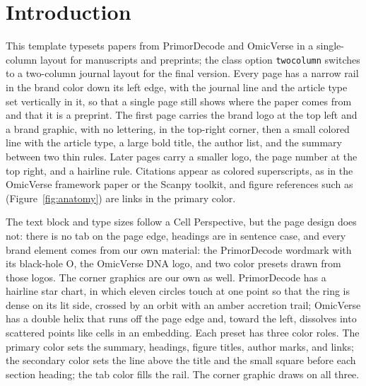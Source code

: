 
\section{Introduction}

This template typesets papers from PrimorDecode and OmicVerse in a single-column layout for manuscripts and preprints; the class option \texttt{twocolumn} switches to a two-column journal layout for the final version. Every page has a narrow rail in the brand color down its left edge, with the journal line and the article type set vertically in it, so that a single page still shows where the paper comes from and that it is a preprint. The first page carries the brand logo at the top left and a brand graphic, with no lettering, in the top-right corner, then a small colored line with the article type, a large bold title, the author list, and the summary between two thin rules. Later pages carry a smaller logo, the page number at the top right, and a hairline rule. Citations appear as colored superscripts, as in the OmicVerse framework paper\cite{zeng2024omicverse} or the Scanpy toolkit,\cite{wolf2018scanpy} and figure references such as (Figure~\ref{fig:anatomy}) are links in the primary color.

The text block and type sizes follow a Cell Perspective,\cite{guo2026autonomous} but the page design does not: there is no tab on the page edge, headings are in sentence case, and every brand element comes from our own material: the PrimorDecode wordmark with its black-hole O, the OmicVerse DNA logo, and two color presets drawn from those logos. The corner graphics are our own as well. PrimorDecode has a hairline star chart, in which eleven circles touch at one point so that the ring is dense on its lit side, crossed by an orbit with an amber accretion trail; OmicVerse has a double helix that runs off the page edge and, toward the left, dissolves into scattered points like cells in an embedding. Each preset has three color roles. The primary color sets the summary, headings, figure titles, author marks, and links; the secondary color sets the line above the title and the small square before each section heading; the tab color fills the rail. The corner graphic draws on all three.

